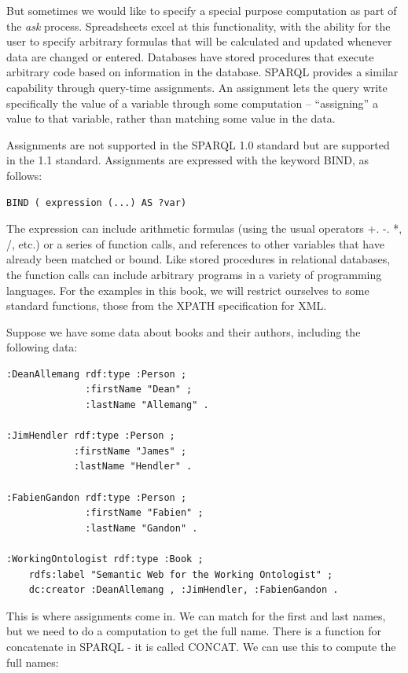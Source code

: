 But sometimes we would like to specify a special purpose computation as
part of the \emph{ask} process. Spreadsheets excel at this functionality, with
the ability for the user to specify arbitrary formulas that will be
calculated and updated whenever data are changed or entered. Databases
have stored procedures that execute arbitrary code based on information
in the database. SPARQL provides a similar capability through query-time
assignments. An assignment lets the query write specifically the value
of a variable through some computation -- ``assigning'' a value to that
variable, rather than matching some value in the data.

Assignments are not supported in the SPARQL 1.0 standard but are
supported in the 1.1 standard. Assignments are expressed with the
keyword BIND,  as follows:

\begin{lstlisting}
BIND ( expression (...) AS ?var)
\end{lstlisting}

The expression can include arithmetic formulas (using the usual
operators +. -. *, /, etc.) or a series of function calls, and references to other variables
that have already been matched or bound. Like stored
procedures in relational databases, the function calls can include
arbitrary programs in a variety of programming languages. For the
examples in this book, we will restrict ourselves to some standard
functions, those from the XPATH specification for XML.

Suppose we have some data about books and their authors, including the
following data:

\begin{lstlisting}
:DeanAllemang rdf:type :Person ;
              :firstName "Dean" ;
              :lastName "Allemang" .

:JimHendler rdf:type :Person ;
            :firstName "James" ;
            :lastName "Hendler" .

:FabienGandon rdf:type :Person ;
              :firstName "Fabien" ;
              :lastName "Gandon" .

:WorkingOntologist rdf:type :Book ;
    rdfs:label "Semantic Web for the Working Ontologist" ;
    dc:creator :DeanAllemang , :JimHendler, :FabienGandon .
\end{lstlisting}


This is where assignments come in. We can match for the first and last
names, but we need to do a computation to get the full name. There is a
function for concatenate in SPARQL - it is called CONCAT. We
can use this to compute the full names:

